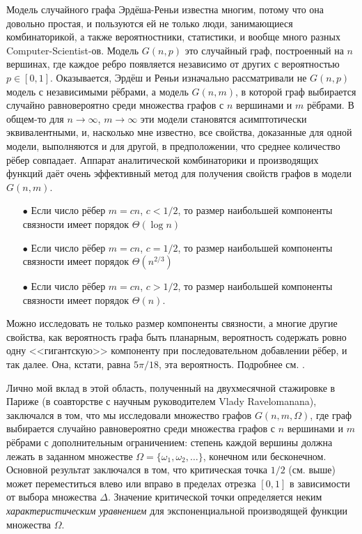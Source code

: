 \documentclass{article}
\theoremstyle{definition}
\begin{document}
Модель случайного графа Эрдёша-Реньи известна многим, потому что она довольно 
простая, и пользуются ей не только люди, занимающиеся комбинаторикой, а также 
вероятностники, статистики, и вообще много разных Computer-Scientist-ов. 
Модель \( G(n,p) \) это случайный граф, построенный на \( n \) вершинах, где 
каждое ребро появляется независимо от других с вероятностью \( p \in [0, 1] \).
Оказывается, Эрдёш и Реньи изначально рассматривали не \( G(n,p) \) модель с 
независимыми 
рёбрами, а модель \( G(n,m) \), в которой граф выбирается случайно 
равновероятно среди множества графов с \( n \) вершинами и \( m \) рёбрами. В 
общем-то для \( n \to \infty \), \( m \to \infty \) эти модели становятся 
асимптотически эквивалентными, и, насколько мне известно, все свойства, 
доказанные для одной модели, выполняются и для другой, в предположении, что 
среднее количество рёбер совпадает.
Аппарат аналитической комбинаторики и производящих функций даёт очень 
эффективный метод для получения свойств графов в модели \( G(n,m) \).
\begin{enumerate}
\item[\( \bullet \)] Если число рёбер \( m  = c n \), \( c < 1/2 \), то размер 
наибольшей компоненты связности имеет порядок \( \Theta(\log n) \)
\item[\( \bullet \)] Если число рёбер \( m  = c n \), \( c = 1/2 \), то размер 
наибольшей компоненты связности имеет порядок \( \Theta(n^{2/3}) \)
\item[\( \bullet \)] Если число рёбер \( m  = c n \), \( c > 1/2 \), то размер 
наибольшей компоненты связности имеет порядок \( \Theta(n) \).
\end{enumerate}
Можно исследовать не только размер компоненты связности, а многие другие 
свойства, как вероятность графа быть планарным, вероятность содержать ровно 
одну <<гигантскую>> компоненту при последовательном добавлении рёбер, и так 
далее. Она, кстати, равна \( 5\pi / 18 \), эта вероятность. Подробнее см. 
\cite{giant_component}.

Лично мой вклад в этой область, полученный на двухмесячной стажировке в 
Париже (в соавторстве с научным руководителем Vlady Ravelomanana), заключался в 
том, что мы исследовали множество графов \( G(n,m,\Omega) 
\), где граф выбирается случайно равновероятно среди множества графов с \( n \) 
вершинами и \( m \) рёбрами с дополнительным ограничением: степень каждой 
вершины должна лежать в заданном множестве \( \Omega = \{\omega_1, \omega_2, 
\ldots \} 
\), конечном или бесконечном. Основной результат заключался в том, что 
критическая точка \( 1/2 \) (см. выше) может переместиться влево или вправо в 
пределах отрезка \( [0, 1] \) в зависимости от выбора множества \( \Delta \). 
Значение критической точки определяется неким  \textit{характеристическим 
уравнением} для экспоненциальной производящей функции множества \( \Omega \).
\end{document}
